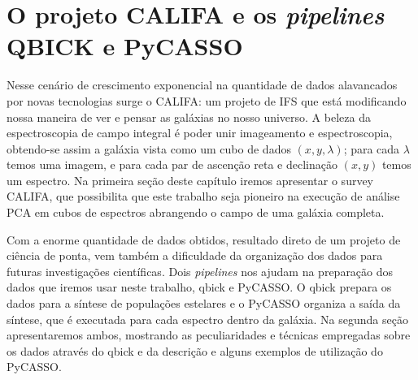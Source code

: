 


\chapter{O projeto CALIFA e os {\em pipelines} QBICK e PyCASSO}
\label{sec:CALePyC}

Nesse cenário de crescimento exponencial na quantidade de dados alavancados por novas tecnologias surge o CALIFA: um
projeto de IFS que está modificando nossa maneira de ver e pensar as galáxias no nosso universo. A beleza da
espectroscopia de campo integral é poder unir imageamento e espectroscopia, obtendo-se assim a galáxia vista como um
cubo de dados $(x, y, \lambda)$; para cada $\lambda$ temos uma imagem, e para cada par de ascenção reta e declinação
$(x, y)$ temos um espectro. Na primeira seção deste capítulo iremos apresentar o survey CALIFA, que possibilita que este
trabalho seja pioneiro na execução de análise PCA em cubos de espectros abrangendo o campo de uma galáxia completa.

Com a enorme quantidade de dados obtidos, resultado direto de um projeto de ciência de ponta, vem também a dificuldade
da organização dos dados para futuras investigações científicas. Dois {\em pipelines} nos ajudam na preparação dos dados
que iremos usar neste trabalho, {\sc qbick} e PyCASSO. O {\sc qbick} prepara os dados para a síntese de populações
estelares e o PyCASSO organiza a saída da síntese, que é executada para cada espectro dentro da galáxia. Na segunda
seção apresentaremos ambos, mostrando as peculiaridades e técnicas empregadas sobre os dados através do {\sc qbick} e da
descrição e alguns exemplos de utilização do PyCASSO.

